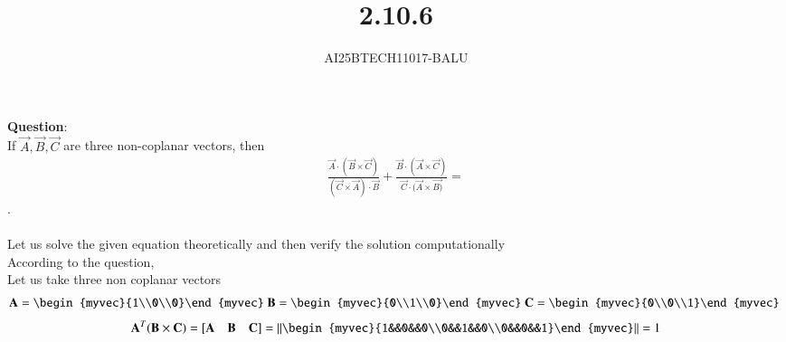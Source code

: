 \documentclass[journal]{IEEEtran}
\begin{document}

\vspace{3cm}

\title{2.10.6}
\author{AI25BTECH11017-BALU}
 \maketitle
{\let\newpage\relax\maketitle}
\renewcommand{\thefigure}{\theenumi}
\renewcommand{\thetable}{\theenumi}
\setlength{\intextsep}{10pt} %
\renewcommand{\thetable}{\theenumi}
\textbf{Question}:\\
 If $\vec{A}, \vec{B}, \vec{C}$ are three non-coplanar vectors, then
\begin{align}
\frac{\vec{A} \cdot(\vec{B}\times\vec{C})}{(\vec{C} \times \vec{A}) \cdot \vec{B}}
+ \frac{\vec{B} \cdot(\vec{A}\times \vec{C})}{\vec{C} \cdot (\vec{A} \times \vec{B)}}
= 
\end{align}.\\
\solution \\
Let us solve the given equation theoretically and then verify the solution computationally \\
According to the question, \\
Let us take three non coplanar vectors \\
\begin{align}
\vec{A}=\begin{myvec}{1\\0\\0}\end{myvec}\
\vec{B}=\begin{myvec}{0\\1\\0}\end{myvec}\
\vec{C}=\begin{myvec}{0\\0\\1}\end{myvec}\
\end{align}
\begin{align}
\vec{A}^T(\vec{B}\times\vec{C})=[\vec{A}\quad\vec{B}\quad\vec{C}]=
\left\|\begin{myvec}{1&&0&&0\\0&&1&&0\\0&&0&&1}\end{myvec}\right\|=1
\end{align}
\end{document}

